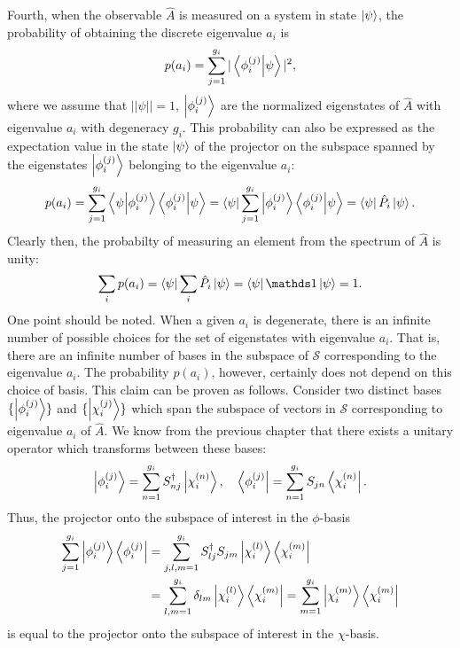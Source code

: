 Fourth, when the observable $\hat{A}$ is measured on a system in state $\ket{\psi}$, the probability of obtaining the discrete eigenvalue $a_{i}$ is
\begin{eqnarray}
    p(a_{i}) = \sum_{j=1}^{g_{i}} | \bra{\phi_{i}^{(j)}} \ket{\psi} |^2
,\end{eqnarray}
where we assume that $|| \psi || = 1$, $\ket{\phi_{i}^{(j)}}$ are the normalized eigenstates of $\hat{A}$ with eigenvalue $a_{i}$ with degeneracy $g_{i}$.
This probability can also be expressed as the expectation value in the state $\ket{\psi}$ of the projector on the subspace spanned by the eigenstates $\ket{\phi_{i}^{(j)}}$ belonging to the eigenvalue $a_{i}$:
\begin{eqnarray}
    p(a_{i}) = \sum_{j=1}^{g_{i}} \bra{\psi} \ket{\phi_{i}^{(j)}} \bra{\phi_{i}^{(j)}} \ket{\psi} = \bra{\psi} \sum_{j=1}^{g_{i}} \ket{\phi_{i}^{(j)}} \bra{\phi_{i}^{(j)}} \ket{\psi} = \bra{\psi} \hat{P}_{i} \ket{\psi}
.\end{eqnarray}
Clearly then, the probabilty of measuring an element from the spectrum of $\hat{A}$ is unity:
\begin{eqnarray}
    \sum_{i} p(a_{i}) = \bra{\psi} \sum_{i} \hat{P}_{i} \ket{\psi} = \bra{\psi} \id \ket{\psi} = 1
.\end{eqnarray}
One point should be noted.
When a given $a_{i}$ is degenerate, there is an infinite number of possible choices for the set of eigenstates with eigenvalue $a_{i}$.
That is, there are an infinite number of bases in the subspace of $\mathcal{S}$ corresponding to the eigenvalue $a_{i}$.
The probability $p(a_{i})$, however, certainly does not depend on this choice of basis.
This claim can be proven as follows.
Consider two distinct bases $\{ \ket{\phi_{i}^{(j)}} \}$ and $\{ \ket{\chi_{i}^{(j)}} \}$ which span the subspace of vectors in $\mathcal{S}$ corresponding to eigenvalue $a_{i}$ of $\hat{A}$.
We know from the previous chapter that there exists a unitary operator which transforms between these bases:
\begin{eqnarray}
    \ket{\phi_{i}^{(j)}} = \sum_{n=1}^{g_{i}} S^{\dagger}_{nj} \ket{\chi_{i}^{(n)}}, \quad \bra{\phi_{i}^{(j)}} = \sum_{n=1}^{g_{i}} S_{jn} \bra{\chi_{i}^{(n)}}
.\end{eqnarray}
Thus, the projector onto the subspace of interest in the $\phi$-basis 
\begin{align}
    \sum_{j=1}^{g_{i}} \ket{\phi_{i}^{(j)}} \bra{\phi_{i}^{(j)}} &= \sum_{j,l,m=1}^{g_{i}} S^{\dagger}_{lj}S_{jm} \ket{\chi_{i}^{(l)}}\bra{\chi_{i}^{(m)}} \nonumber \\
    &= \sum_{l,m=1}^{g_{i}} \delta_{lm} \ket{\chi_{i}^{(l)}} \bra{\chi_{i}^{(m)}} = \sum_{m=1}^{g_{i}} \ket{\chi_{i}^{(m)}} \bra{\chi_{i}^{(m)}}
\end{align}
is equal to the projector onto the subspace of interest in the $\chi$-basis.

